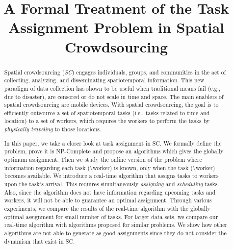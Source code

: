 \documentclass{sig-alternate}
\title{A Formal Treatment of the Task Assignment Problem in Spatial Crowdsourcing}
\begin{document}

\maketitle
\begin{abstract}
Spatial crowdsourcing (\textit{SC}) engages individuals, groups, and communities in the act of collecting, analyzing, and disseminating spatiotemporal information. This new paradigm of data collection has shown to be useful when traditional means fail (e.g., due to disaster), are censored or do not scale in time and space. The main enablers of spatial crowdsourcing are mobile devices. With spatial crowdsourcing, the goal is to efficiently outsource a set of spatiotemporal tasks (i.e., tasks related to time and location) to a set of workers, which requires the workers to perform the tasks by \textit{physically traveling} to those locations.

In this paper, we take a closer look at task assignment in SC. We formally define the problem, prove it is NP-Complete and propose an algorithms which gives the globally optimum assignment. Then we study the online version of the problem where information regarding each task (\textbackslash worker) is known, only when the task (\textbackslash worker) becomes available. We introduce a real-time algorithm that assigns tasks to workers upon the task's arrival. This requires simultaneously \textit{assigning} and \textit{scheduling} tasks. Also, since the algorithm does not have information regarding upcoming tasks and workers, it will not be able to guarantee an optimal assignment. Through various experiments, we compare the results of the real-time algorithm with the globally optimal assignment for small number of tasks. For larger data sets, we compare our real-time algorithm with algorithms proposed for similar problems. We show how other algorithms are not able to generate as good assignments since they do not consider the dynamism that exist in SC.

\end{abstract}











%





\begin{scriptsize}


\end{scriptsize}

%
\end{document}
